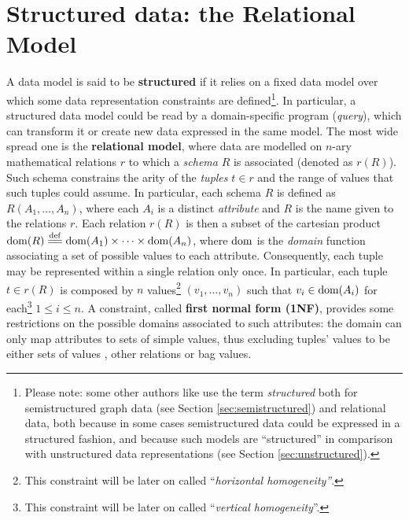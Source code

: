 
\section{Structured data: the Relational Model}\label{sec:relationalcmp}
A data model is said to be \textbf{structured} if it relies on a fixed data model over which some data representation constraints are defined\footnote{Please note: some other authors like \cite{ZhangRCSWW17,Sarawagi} use the term \textit{structured} both for semistructured graph data (see Section \vref{sec:semistructured}) and relational data, both because in some cases semistructured data could be expressed in a structured fashion, and because such models are ``structured'' in comparison with unstructured data representations (see Section \vref{sec:unstructured}).}. In particular, a structured data model could be read by a domain-specific program (\textit{query}), which can transform it or create new data expressed in the same model. The most wide spread one is the \textbf{relational model}, where data are modelled on $n$-ary mathematical relations $r$ \cite{RelGraph} to which a \textit{schema} $R$ is associated (denoted as $r(R)$). Such schema constrains the arity of the \textit{tuples} $t\in r$  and the range of values that such tuples could assume. In particular, each schema $R$ is defined as $R(A_1,\dots,A_n)$, where each $A_i$ is a distinct \textit{attribute} and $R$ is the name given to the relations $r$. Each relation $r(R)$ is then a subset of the cartesian product $\operatorname{dom}(R)\overset{\mathrm{def}}{=\mathrel{\mkern-3mu}=}\operatorname{dom}(A_1)\times\dots\times \operatorname{dom}(A_n)$, where $\operatorname{dom}$ is the \textit{domain} function associating a set of possible values to each attribute. Consequently, each tuple may be represented within a single relation only once. In particular, each tuple $t\in r(R)$ is composed by $n$ values\footnote{This constraint will be later on called ``\textit{horizontal homogeneity''}.} $(v_1,\dots,v_n)$ such that $v_i\in \operatorname{dom}(A_i)$ for each\footnote{This constraint will be later on called ``\textit{vertical homogeneity}''.} $1\leq i\leq n$. A constraint, called \textbf{first normal form (1NF)}, provides some restrictions on the possible domains associated to such attributes: the domain  can only map attributes to sets of simple values, thus excluding tuples' values to be either sets of values \cite{Codd71a}, other relations \cite{Elmasri} or bag values.

